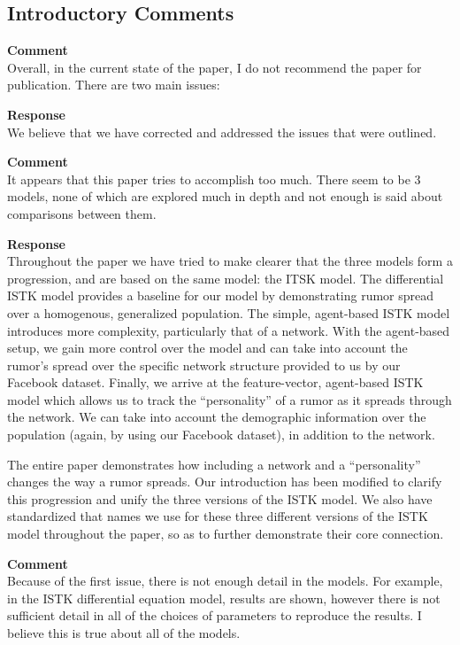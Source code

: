 \subsection{Introductory Comments}
\setcounter{rev2-intro}{1}

\textbf{Comment } \\
Overall, in the current state of the paper, I do not recommend the paper for publication.
There are two main issues:

\textbf{Response } \\
We believe that we have corrected and addressed the issues that were outlined.

\textbf{Comment } \\
It appears that this paper tries to accomplish too much.
There seem to be 3 models, none of which are explored much in depth and not enough is said about comparisons between them.

\textbf{Response } \\
Throughout the paper we have tried to make clearer that the three models form a progression, and are based on the same model: the ITSK model.
The differential ISTK model provides a baseline for our model by demonstrating rumor spread over a homogenous, generalized population.
The simple, agent-based ISTK model introduces more complexity, particularly that of a network.
With the agent-based setup, we gain more control over the model and can take into account the rumor's spread over the specific network structure provided to us by our Facebook dataset.
Finally, we arrive at the feature-vector, agent-based ISTK model which allows us to track the ``personality'' of a rumor as it spreads through the network.
We can take into account the demographic information over the population (again, by using our Facebook dataset), in addition to the network.

The entire paper demonstrates how including a network and a ``personality'' changes the way a rumor spreads.
Our introduction has been modified to clarify this progression and unify the three versions of the ISTK model.
We also have standardized that names we use for these three different versions of the ISTK model throughout the paper, so as to further demonstrate their core connection.

\textbf{Comment } \\
Because of the first issue, there is not enough detail in the models.
For example, in the ISTK differential equation model, results are shown, however there is not sufficient detail in all of the choices of parameters to reproduce the results.
I believe this is true about all of the models.

